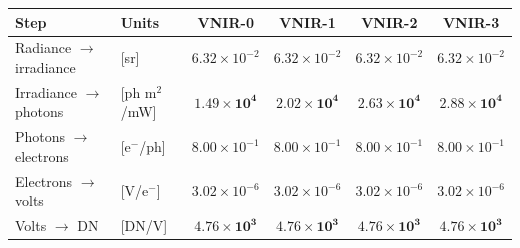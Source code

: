 \begin{tabular}{llcccc}
\toprule
Step & Units & VNIR-0 & VNIR-1 & VNIR-2 & VNIR-3 \\
\midrule
Radiance $\rightarrow$ irradiance & [sr] & $6.32\times10^{-2}$ & $6.32\times10^{-2}$ & $6.32\times10^{-2}$ & $6.32\times10^{-2}$ \\
Irradiance $\rightarrow$ photons & [ph m$^2$/mW] & $\mathbf{1.49\times10^{4}}$ & $\mathbf{2.02\times10^{4}}$ & $\mathbf{2.63\times10^{4}}$ & $\mathbf{2.88\times10^{4}}$ \\
Photons $\rightarrow$ electrons & [e$^-$/ph] & $8.00\times10^{-1}$ & $8.00\times10^{-1}$ & $8.00\times10^{-1}$ & $8.00\times10^{-1}$ \\
Electrons $\rightarrow$ volts & [V/e$^-$] & $3.02\times10^{-6}$ & $3.02\times10^{-6}$ & $3.02\times10^{-6}$ & $3.02\times10^{-6}$ \\
Volts $\rightarrow$ DN & [DN/V] & $\mathbf{4.76\times10^{3}}$ & $\mathbf{4.76\times10^{3}}$ & $\mathbf{4.76\times10^{3}}$ & $\mathbf{4.76\times10^{3}}$ \\
\bottomrule
\end{tabular}
